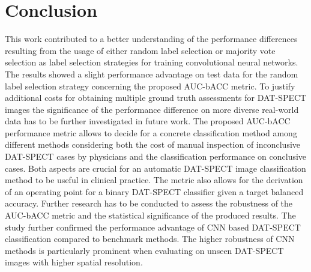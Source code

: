 \section{Conclusion}

This work contributed to a better understanding of the performance differences 
resulting from the usage of either random label selection or majority vote selection
as label selection strategies for training convolutional neural networks.
The results showed a slight performance advantage on test data for the random label selection strategy 
concerning the proposed AUC-bACC metric.
To justify additional costs for obtaining multiple ground truth assessments for DAT-SPECT images
the significance of the performance difference on more diverse real-world data 
has to be further investigated in future work.
The proposed AUC-bACC performance metric allows to decide for a concrete classification method among different methods
considering both the cost of manual inspection of inconclusive DAT-SPECT cases 
by physicians and the classification performance on conclusive cases.
Both aspects are crucial for an automatic DAT-SPECT image classification method to be useful in clinical practice.
The metric also allows for the derivation of an operating point for a binary DAT-SPECT classifier 
given a target balanced accuracy.
Further research has to be conducted to assess the robustness of the AUC-bACC metric 
and the statistical significance of the produced results.
The study further confirmed the performance advantage of CNN based DAT-SPECT classification compared to benchmark methods.
The higher robustness of CNN methods is particularly prominent when evaluating on unseen DAT-SPECT images 
with higher spatial resolution.





